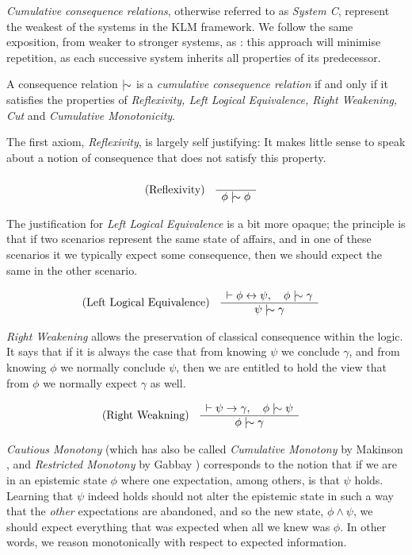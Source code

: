 \textit{Cumulative consequence relations}, otherwise referred to as \textit{System C}, represent the weakest of the systems
in the KLM framework. We follow the same exposition, from weaker to stronger systems, as \cite{kraus1990nonmonotonic}: this
approach will minimise repetition, as each successive system inherits all properties of its predecessor.

\begin{definition}
	\label{definition:cumulative-consequence-relation} A consequence relation $\twiddle$ is a \emph{cumulative consequence
	relation} if and only if it satisfies the properties of \emph{Reflexivity, Left Logical Equivalence, Right Weakening, Cut}
	and \emph{Cumulative Monotonicity}.
\end{definition}

The first axiom, \textit{Reflexivity}, is largely self justifying: It makes little sense to speak about a notion of consequence
that does not satisfy this property.

\begin{align}
	\label{postulate:ref}\inferLeft{Reflexivity}{}{\phi \twiddle \phi}
\end{align}

The justification for \textit{Left Logical Equivalence} is a bit more opaque; the principle is that if two scenarios
represent the same state of affairs, and in one of these scenarios it we typically expect some consequence, then we
should expect the same in the other scenario.

\begin{align}
	\label{postulate:lle}\inferLeft{Left Logical Equivalence}{\vdash \phi \leftrightarrow \psi, \quad \phi \twiddle \gamma}{\psi \twiddle \gamma}
\end{align}

\textit{Right Weakening} allows the preservation of classical consequence within the logic. It says that if it is always
the case that from knowing $\psi$ we conclude $\gamma$, and from knowing $\phi$ we normally conclude $\psi$, then we are
entitled to hold the view that from $\phi$ we normally expect $\gamma$ as well.

\begin{align}
	\label{postulate:rw}\inferLeft{Right Weakning}{\vdash \psi \rightarrow \gamma, \quad \phi \twiddle \psi}{\phi \twiddle \gamma}
\end{align}

\textit{Cautious Monotony} (which has also be called \textit{Cumulative Monotony} by Makinson \cite{makinson2003bridges},
and \textit{Restricted Monotony} by Gabbay \cite{gabbay1985theoreticalFoundations}) corresponds to the notion that if we
are in an epistemic state $\phi$ where one expectation, among others, is that $\psi$ holds. Learning that $\psi$ indeed holds
should not alter the epistemic state in such a way that the \textit{other} expectations are abandoned, and so the new state,
$\phi \land \psi$, we should expect everything that was expected when all we knew was $\phi$. In other words, we reason monotonically
with respect to expected information.

